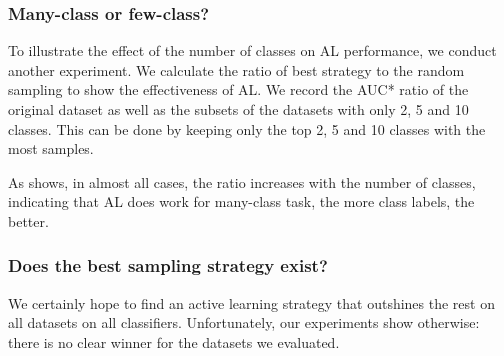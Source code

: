 



\subsubsection{Many-class or few-class?}
To illustrate the effect of the number of classes on AL performance, 
we conduct another experiment. We calculate the ratio of best strategy to 
the random sampling to show the effectiveness of AL. 
We record the AUC* ratio of the original dataset as well as the subsets 
of the datasets with only 2, 5 and 10 classes. This can be done by keeping only the top 2, 5 and 10 classes with the most samples.

As  shows, in almost all cases, 
the ratio increases with the number of classes, indicating that AL does work 
for many-class task, the more class labels, the better.

\subsubsection{Does the best sampling strategy exist?}
We certainly hope to find an active learning strategy 
that outshines the rest on all datasets on all classifiers. 
Unfortunately, our experiments show otherwise: there is no clear winner 
for the datasets we evaluated. 

